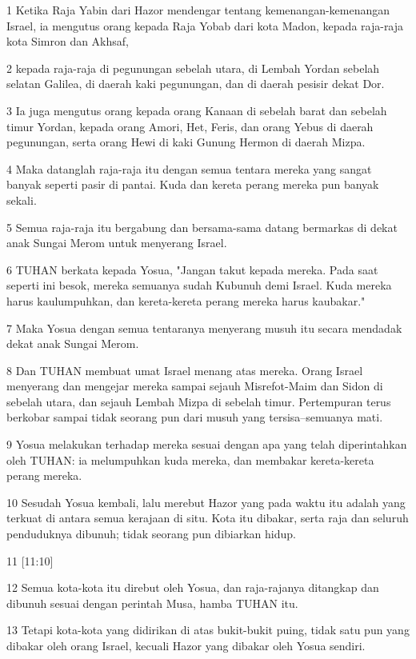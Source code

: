 \par 1 Ketika Raja Yabin dari Hazor mendengar tentang kemenangan-kemenangan Israel, ia mengutus orang kepada Raja Yobab dari kota Madon, kepada raja-raja kota Simron dan Akhsaf,
\par 2 kepada raja-raja di pegunungan sebelah utara, di Lembah Yordan sebelah selatan Galilea, di daerah kaki pegunungan, dan di daerah pesisir dekat Dor.
\par 3 Ia juga mengutus orang kepada orang Kanaan di sebelah barat dan sebelah timur Yordan, kepada orang Amori, Het, Feris, dan orang Yebus di daerah pegunungan, serta orang Hewi di kaki Gunung Hermon di daerah Mizpa.
\par 4 Maka datanglah raja-raja itu dengan semua tentara mereka yang sangat banyak seperti pasir di pantai. Kuda dan kereta perang mereka pun banyak sekali.
\par 5 Semua raja-raja itu bergabung dan bersama-sama datang bermarkas di dekat anak Sungai Merom untuk menyerang Israel.
\par 6 TUHAN berkata kepada Yosua, "Jangan takut kepada mereka. Pada saat seperti ini besok, mereka semuanya sudah Kubunuh demi Israel. Kuda mereka harus kaulumpuhkan, dan kereta-kereta perang mereka harus kaubakar."
\par 7 Maka Yosua dengan semua tentaranya menyerang musuh itu secara mendadak dekat anak Sungai Merom.
\par 8 Dan TUHAN membuat umat Israel menang atas mereka. Orang Israel menyerang dan mengejar mereka sampai sejauh Misrefot-Maim dan Sidon di sebelah utara, dan sejauh Lembah Mizpa di sebelah timur. Pertempuran terus berkobar sampai tidak seorang pun dari musuh yang tersisa--semuanya mati.
\par 9 Yosua melakukan terhadap mereka sesuai dengan apa yang telah diperintahkan oleh TUHAN: ia melumpuhkan kuda mereka, dan membakar kereta-kereta perang mereka.
\par 10 Sesudah Yosua kembali, lalu merebut Hazor yang pada waktu itu adalah yang terkuat di antara semua kerajaan di situ. Kota itu dibakar, serta raja dan seluruh penduduknya dibunuh; tidak seorang pun dibiarkan hidup.
\par 11 [11:10]
\par 12 Semua kota-kota itu direbut oleh Yosua, dan raja-rajanya ditangkap dan dibunuh sesuai dengan perintah Musa, hamba TUHAN itu.
\par 13 Tetapi kota-kota yang didirikan di atas bukit-bukit puing, tidak satu pun yang dibakar oleh orang Israel, kecuali Hazor yang dibakar oleh Yosua sendiri.
